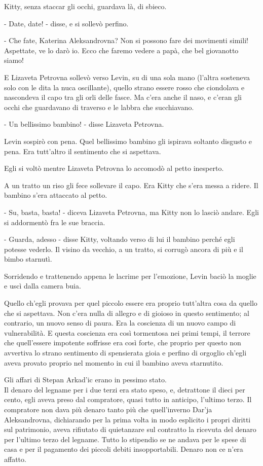 Kitty, senza staccar gli occhi, guardava là, di sbieco. 

- Date, date! - disse, e si sollevò perfino. 

- Che fate, Katerina Aleksandrovna? Non si possono fare dei movimenti simili! Aspettate, ve lo darò io. Ecco che faremo vedere a papà, che bel giovanotto siamo! 

E Lizaveta Petrovna sollevò verso Levin, su di una sola mano (l'altra sosteneva solo con le dita la nuca oscillante), quello strano essere rosso che ciondolava e nascondeva il capo tra gli orli delle fasce. Ma c'era anche il naso, e c'eran gli occhi che guardavano di traverso e le labbra che succhiavano. 

- Un bellissimo bambino! - disse Lizaveta Petrovna. 

Levin sospirò con pena. Quel bellissimo bambino gli ispirava soltanto disgusto e pena. Era tutt'altro il sentimento che si aspettava. 

Egli si voltò mentre Lizaveta Petrovna lo accomodò al petto inesperto. 

A un tratto un riso gli fece sollevare il capo. Era Kitty che s'era messa a ridere. Il bambino s'era attaccato al petto. 

- Su, basta, basta! - diceva Lizaveta Petrovna, ma Kitty non lo lasciò andare. Egli si addormentò fra le sue braccia. 

- Guarda, adesso - disse Kitty, voltando verso di lui il bambino perché egli potesse vederlo. Il visino da vecchio, a un tratto, si corrugò ancora di più e il bimbo starnutì. 

Sorridendo e trattenendo appena le lacrime per l'emozione, Levin baciò la moglie e uscì dalla camera buia. 

Quello ch'egli provava per quel piccolo essere era proprio tutt'altra cosa da quello che si aspettava. Non c'era nulla di allegro e di gioioso in questo sentimento; al contrario, un nuovo senso di paura. Era la coscienza di un nuovo campo di vulnerabilità. E questa coscienza era così tormentosa nei primi tempi, il terrore che quell'essere impotente soffrisse era così forte, che proprio per questo non avvertiva lo strano sentimento di spensierata gioia e perfino di orgoglio ch'egli aveva provato proprio nel momento in cui il bambino aveva starnutito. 

Gli affari di Stepan Arkad'ic erano in pessimo stato. \\
Il denaro del legname per i due terzi era stato speso, e, detrattone il dieci per cento, egli aveva preso dal compratore, quasi tutto in anticipo, l'ultimo terzo. Il compratore non dava più denaro tanto più che quell'inverno Dar'ja Aleksandrovna, dichiarando per la prima volta in modo esplicito i propri diritti sul patrimonio, aveva rifiutato di quietanzare sul contratto la ricevuta del denaro per l'ultimo terzo del legname. Tutto lo stipendio se ne andava per le spese di casa e per il pagamento dei piccoli debiti insopportabili. Denaro non ce n'era affatto. 

